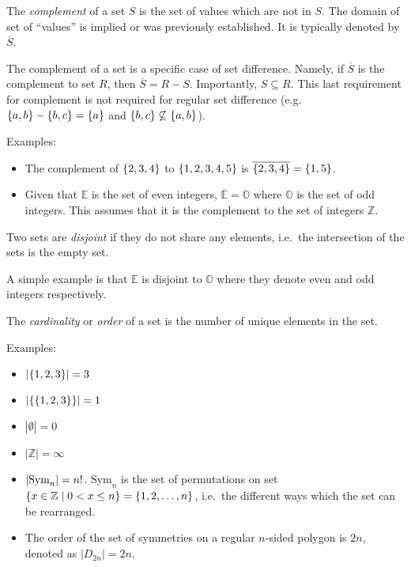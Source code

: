 \bigskip
\begin{definition}
    The \emph{complement} of a set \(S\) is the set of values which are not in \(S\). The domain of set of ``values'' is implied or was previously established. It is typically denoted
    by \(\overline{S}\). 
\end{definition}

The complement of a set is a specific case of set difference. Namely, if \(\overline{S}\) is the complement to set \(R\), then \(\overline{S}=R-S\). Importantly, \(S\subseteq R\). 
This last requirement for complement is not required for regular set difference (e.g.\ \(\{a,b\}-\{b,c\}=\{a\}\) and \(\{b,c\}\not\subseteq\{a,b\}\)).

Examples:
\begin{itemize}
    \item The complement of \(\{2,3,4\}\) to \(\{1,2,3,4,5\}\) is \(\overline{\{2,3,4\}}=\{1,5\}\).
    \item Given that \(\mathbb{E}\) is the set of even integers, \(\overline{\mathbb{E}}=\mathbb{O}\) where \(\mathbb{O}\) is the set of odd integers. This assumes that it is the complement
    to the set of integers \(\mathbb{Z}\).
\end{itemize}

\bigskip
\begin{definition}
    Two sets are \emph{disjoint} if they do not share any elements, i.e.\ the intersection of the sets is the empty set.
\end{definition}

A simple example is that \(\mathbb{E}\) is disjoint to \(\mathbb{O}\) where they denote even and odd integers respectively.

\bigskip
\begin{definition}
    The \emph{cardinality} or \emph{order} of a set is the number of unique elements in the set.
\end{definition}

Examples:
\begin{itemize}
    \item \(|\{1,2,3\}|=3\)
    \item \(|\{\{1,2,3\}\}|=1\)
    \item \(|\emptyset|=0\)
    \item \(|\mathbb{Z}|=\infty\)
    \item \(|\text{Sym}_{n}|=n!\). \(\text{Sym}_n\) is the set of permutations on set \(\{x\in\mathbb{Z}\mid0<x\le n\}=\{1,2,\dots,n\}\), i.e.\ the 
    different ways which the set can be rearranged.  
    \item The order of the set of symmetries on a regular \(n\)-sided polygon is \(2n\), denoted as \(|D_{2n}|=2n\).
\end{itemize}

